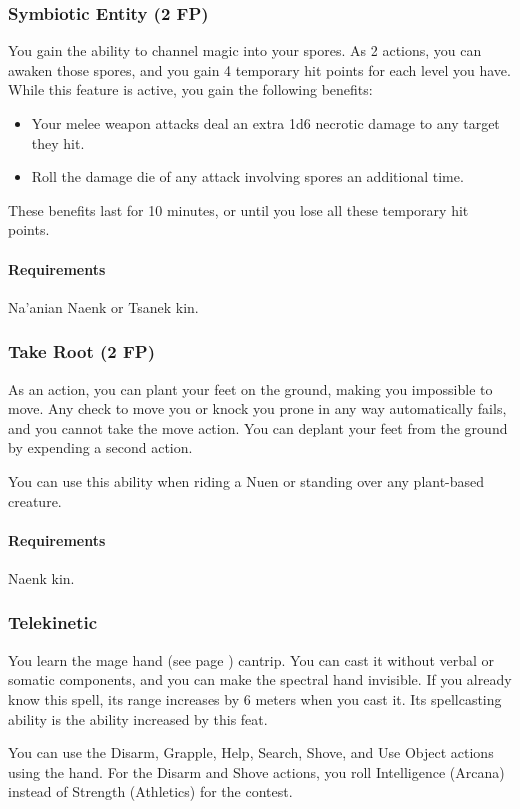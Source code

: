 \subsubsection{Symbiotic Entity (2 FP)} \label{feat::symbioticentity}
    You gain the ability to channel magic into your spores.
    As 2 actions, you can awaken those spores, and you gain 4 temporary hit points for each level you have.
    While this feature is active, you gain the following benefits:
    \begin{itemize}
        \item Your melee weapon attacks deal an extra 1d6 necrotic damage to any target they hit.
        \item Roll the damage die of any attack involving spores an additional time.
    \end{itemize}
    These benefits last for 10 minutes, or until you lose all these temporary hit points.
    \paragraph{Requirements} Na'anian Naenk or Tsanek kin.
\subsubsection{Take Root (2 FP)} \label{feat::takeroot}
    As an action, you can plant your feet on the ground, making you impossible to move.
    Any check to move you or knock you prone in any way automatically fails, and you cannot take the move action.
    You can deplant your feet from the ground by expending a second action.

    You can use this ability when riding a Nuen or standing over any plant-based creature.
    \paragraph{Requirements} Naenk kin.
\subsubsection{Telekinetic} \label{feat::telekinetic}
    You learn the mage hand (see page \pageref{spell:magehand}) cantrip.
    You can cast it without verbal or somatic components, and you can make the spectral hand invisible.
    If you already know this spell, its range increases by 6 meters when you cast it.
    Its spellcasting ability is the ability increased by this feat.

    You can use the Disarm, Grapple, Help, Search, Shove, and Use Object actions using the hand.
    For the Disarm and Shove actions, you roll Intelligence (Arcana) instead of Strength (Athletics) for the contest.

